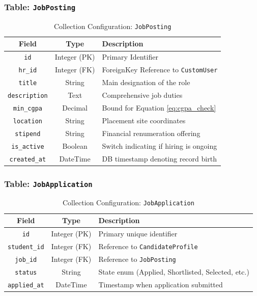 \documentclass[a4paper,12pt]{report}
\begin{document}
\subsubsection*{Table: \texttt{JobPosting}}
\begin{table}[H]
\centering
\caption{Collection Configuration: \texttt{JobPosting}}
\label{tab:col_jobs}
\renewcommand{\arraystretch}{1.3}
\begin{tabular}{|c|c|>{\centering\arraybackslash}p{7.5cm}|}
\hline
\textbf{Field}        & \textbf{Type}  & \textbf{Description} \\
\hline
\texttt{id}           & Integer (PK)   & Primary Identifier \\
\texttt{hr\_id}       & Integer (FK)   & ForeignKey Reference to \texttt{CustomUser} \\
\texttt{title}        & String         & Main designation of the role \\
\texttt{description}  & Text           & Comprehensive job duties \\
\texttt{min\_cgpa}    & Decimal        & Bound for Equation \ref{eq:cgpa_check} \\
\texttt{location}     & String         & Placement site coordinates \\
\texttt{stipend}      & String         & Financial renumeration offering \\
\texttt{is\_active}   & Boolean        & Switch indicating if hiring is ongoing \\
\texttt{created\_at}  & DateTime       & DB timestamp denoting record birth \\
\hline
\end{tabular}
\end{table}

\subsubsection*{Table: \texttt{JobApplication}}
\begin{table}[H]
\centering
\caption{Collection Configuration: \texttt{JobApplication}}
\label{tab:col_apps}
\renewcommand{\arraystretch}{1.3}
\begin{tabular}{|c|c|>{\centering\arraybackslash}p{7.5cm}|}
\hline
\textbf{Field} & \textbf{Type} & \textbf{Description} \\
\hline
\texttt{id} & Integer (PK) & Primary unique identifier \\
\texttt{student\_id} & Integer (FK) & Reference to \texttt{CandidateProfile} \\
\texttt{job\_id} & Integer (FK) & Reference to \texttt{JobPosting} \\
\texttt{status} & String & State enum (Applied, Shortlisted, Selected, etc.) \\
\texttt{applied\_at} & DateTime & Timestamp when application submitted \\
\hline
\end{tabular}
\end{table}
\end{document}
